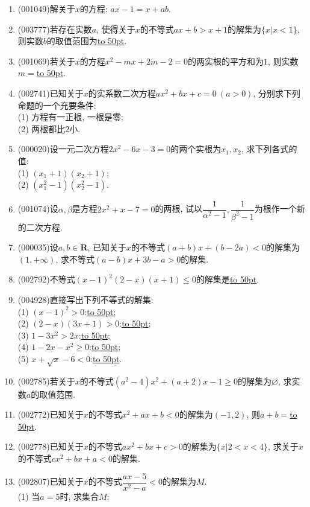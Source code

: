 \documentclass[10pt,a4paper]{article}
\newcommand{\blank}[1]{\underline{\hbox to #1pt{}}}
\begin{document}
\begin{enumerate}[1.]

\item {\tiny (001049)}解关于$x$的方程: $ax-1=x+ab$.
\item {\tiny (003777)}若存在实数$a$, 使得关于$x$的不等式$ax+b>x+1$的解集为$\{x|x<1\}$, 则实数$b$的取值范围为\blank{50}.
\item {\tiny (001069)}若关于$x$的方程$x^2-mx+2m-2=0$的两实根的平方和为$1$, 则实数$m=$\blank{50}.
\item {\tiny (002741)}已知关于$x$的实系数二次方程$a x^2 +bx+c=0\ (a>0)$, 分别求下列命题的一个充要条件:\\
(1) 方程有一正根, 一根是零;\\
(2) 两根都比$2$小.
\item {\tiny (000020)}设一元二次方程$2x^2-6x-3=0$的两个实根为$x_1,x_2$, 求下列各式的值:\\
(1) $(x_1+1)(x_2+1)$;\\
(2) $(x_1^2-1)(x_2^2-1)$.
\item {\tiny (001074)}设$\alpha,\beta$是方程$2x^2+x-7=0$的两根, 试以$\dfrac{1}{\alpha^2-1},\dfrac{1}{\beta^2-1}$为根作一个新的二次方程.
\item {\tiny (000035)}设$a,b\in \mathbf{R}$, 已知关于$x$的不等式$(a+b)x+(b-2a)<0$的解集为$(1, +\infty)$, 求不等式$(a-b)x+3b-a>0$的解集.
\item {\tiny (002792)}不等式$(x-1)^2(2-x)(x+1)\le 0$的解集是\blank{50}.
\item {\tiny (004928)}直接写出下列不等式的解集:\\
(1) $(x-1)^2>0$:\blank{50};\\
(2) $(2-x)(3x+1)>0$:\blank{50};\\
(3) $1-3x^2>2x$:\blank{50};\\
(4) $1-2x-x^2\ge 0$:\blank{50};\\
(5) $x+\sqrt x-6<0$:\blank{50}.
\item {\tiny (002785)}若关于$x$的不等式$(a^2-4)x^2+(a+2)x-1\ge 0$的解集为$\varnothing$, 求实数$a$的取值范围.
\item {\tiny (002772)}已知关于$x$的不等式$x^2+ax+b<0$的解集为$(-1,2)$, 则$a+b=$\blank{50}.
\item {\tiny (002778)}已知关于$x$的不等式$ax^2+bx+c>0$的解集为$\{x|2<x<4\}$, 求关于$x$的不等式$cx^2+bx+a<0$的解集.
\item {\tiny (002807)}已知关于$x$的不等式$\dfrac{ax-5}{x^2-a}<0$的解集为$M$.\\
(1) 当$a=5$时, 求集合$M$;\\

\end{enumerate}
\end{document}
